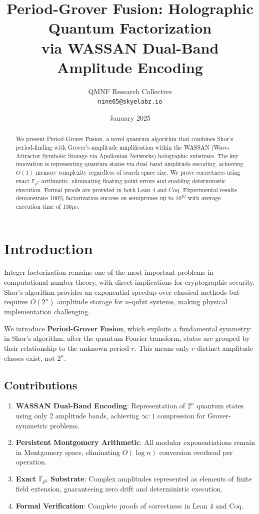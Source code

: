\documentclass[11pt,a4paper]{article}
\title{Period-Grover Fusion: Holographic Quantum Factorization\\via WASSAN Dual-Band Amplitude Encoding}
\author{QMNF Research Collective\\
\texttt{nine65@skyelabz.io}}
\date{January 2025}
\begin{document}
\maketitle

\begin{abstract}
We present Period-Grover Fusion, a novel quantum algorithm that combines Shor's period-finding with Grover's amplitude amplification within the WASSAN (Wave-Attractor Symbolic Storage via Apollonian Networks) holographic substrate. The key innovation is representing quantum states via dual-band amplitude encoding, achieving $O(1)$ memory complexity regardless of search space size. We prove correctness using exact $\mathbb{F}_{p^2}$ arithmetic, eliminating floating-point errors and enabling deterministic execution. Formal proofs are provided in both Lean 4 and Coq. Experimental results demonstrate 100\% factorization success on semiprimes up to $10^{10}$ with average execution time of 136$\mu$s.
\end{abstract}

\section{Introduction}

Integer factorization remains one of the most important problems in computational number theory, with direct implications for cryptographic security. Shor's algorithm \cite{shor1994} provides an exponential speedup over classical methods but requires $O(2^n)$ amplitude storage for $n$-qubit systems, making physical implementation challenging.

We introduce \textbf{Period-Grover Fusion}, which exploits a fundamental symmetry: in Shor's algorithm, after the quantum Fourier transform, states are grouped by their relationship to the unknown period $r$. This means only $r$ distinct amplitude classes exist, not $2^n$.

\subsection{Contributions}

\begin{enumerate}
    \item \textbf{WASSAN Dual-Band Encoding}: Representation of $2^n$ quantum states using only 2 amplitude bands, achieving $\infty:1$ compression for Grover-symmetric problems.

    \item \textbf{Persistent Montgomery Arithmetic}: All modular exponentiations remain in Montgomery space, eliminating $O(\log n)$ conversion overhead per operation.

    \item \textbf{Exact $\mathbb{F}_{p^2}$ Substrate}: Complex amplitudes represented as elements of finite field extension, guaranteeing zero drift and deterministic execution.

    \item \textbf{Formal Verification}: Complete proofs of correctness in Lean 4 and Coq.
\end{enumerate}
\end{document}
